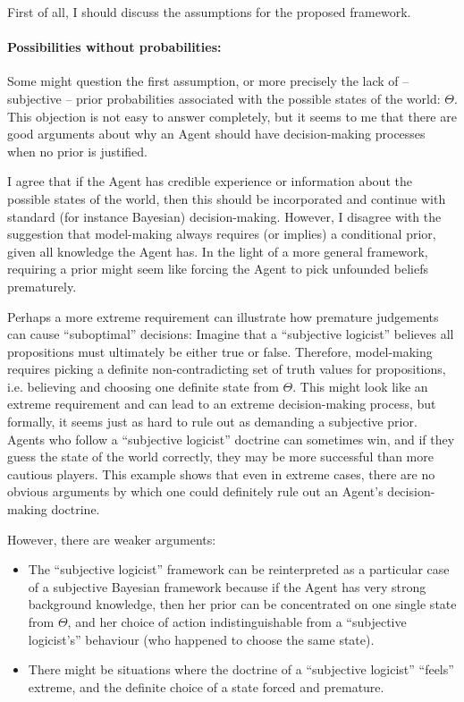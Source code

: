 \documentclass{article}
\begin{document}
First of all, I should discuss the assumptions for the proposed framework.

\paragraph{Possibilities without probabilities:}
Some might question the first assumption, or more precisely the lack of – subjective – prior probabilities associated with the possible states of the world: $\Theta$. This objection is not easy to answer completely, but it seems to me that there are good arguments about why an Agent should have decision-making processes when no prior is justified.

I agree that if the Agent has credible experience or information about the possible states of the world, then this should be incorporated and continue with standard (for instance Bayesian) decision-making.
However, I disagree with the suggestion that model-making always requires (or implies) a conditional prior, given all knowledge the Agent has. In the light of a more general framework, requiring a prior might seem like forcing the Agent to pick unfounded beliefs prematurely.

Perhaps a more extreme requirement can illustrate how premature judgements can cause ``suboptimal'' decisions:
Imagine that a ``subjective logicist'' believes all propositions must ultimately be either true or false. Therefore, model-making requires picking a definite non-contradicting set of truth values for propositions, i.e. believing and choosing one definite state from $\Theta$.
This might look like an extreme requirement and can lead to an extreme decision-making process, but formally, it seems just as hard to rule out as demanding a subjective prior. Agents who follow a ``subjective logicist'' doctrine can sometimes win, and if they guess the state of the world correctly, they may be more successful than more cautious players.
This example shows that even in extreme cases, there are no obvious arguments by which one could definitely rule out an Agent's decision-making doctrine.

However, there are weaker arguments:
\begin{itemize}
    \item The ``subjective logicist'' framework can be reinterpreted as a particular case of a subjective Bayesian framework because if the Agent has very strong background knowledge, then her prior can be concentrated on one single state from $\Theta$, and her choice of action indistinguishable from a ``subjective logicist's'' behaviour (who happened to choose the same state).
    \item There might be situations where the doctrine of a ``subjective logicist'' ``feels'' extreme, and the definite choice of a state forced and premature.
\end{itemize}
\end{document}
